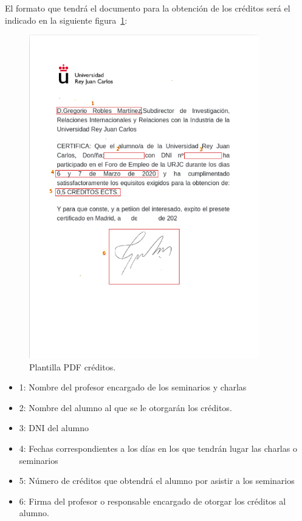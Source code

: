 \documentclass[a4paper, 12pt]{book}
\begin{document}
\clearpage

	El formato que tendrá el documento para la obtención de los créditos será el indicado en la siguiente figura~\ref{fig:pdfcreditos}:
	
\begin{figure}
  \centering
  \includegraphics[width=10cm, keepaspectratio]{img/certificadoCreditos.png}
  \caption{Plantilla PDF créditos.}\label{fig:pdfcreditos}
\end{figure}

\begin{itemize}
		\item 1: Nombre del profesor encargado de los seminarios y charlas
		\item 2: Nombre del alumno al que se le otorgarán los créditos.
		\item 3: DNI del alumno
		\item 4: Fechas correspondientes a los días en los que tendrán lugar las charlas o seminarios
		\item 5: Número de créditos que obtendrá el alumno por asistir a los seminarios
		\item 6: Firma del profesor o responsable encargado de otorgar los créditos al alumno.
		\end{itemize}
\end{document}
